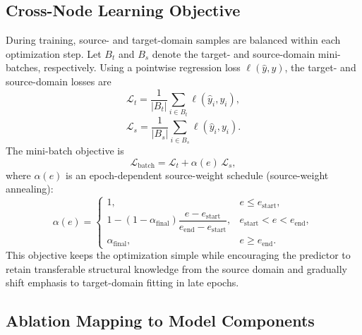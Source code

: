 \documentclass[10pt,a4paper]{article}
\begin{document}
\subsection{Cross-Node Learning Objective}

During training, source- and target-domain samples are balanced within each optimization step. Let $B_t$ and $B_s$ denote the target- and source-domain mini-batches, respectively. Using a pointwise regression loss $\ell(\hat{y},y)$, the target- and source-domain losses are
\begin{equation}
    \mathcal{L}_t =
    \frac{1}{|B_t|}
    \sum_{i \in B_t}
    \ell(\hat{y}_i, y_i),
\end{equation}
\begin{equation}
    \mathcal{L}_s =
    \frac{1}{|B_s|}
    \sum_{i \in B_s}
    \ell(\hat{y}_i, y_i).
\end{equation}
The mini-batch objective is
\begin{equation}
    \mathcal{L}_{\mathrm{batch}} =
    \mathcal{L}_t + \alpha(e)\,\mathcal{L}_s,
\end{equation}
where $\alpha(e)$ is an epoch-dependent source-weight schedule (source-weight annealing):
\begin{equation}
\alpha(e)=
\begin{cases}
1, & e \le e_{\mathrm{start}},\\[4pt]
1-\left(1-\alpha_{\mathrm{final}}\right)\dfrac{e-e_{\mathrm{start}}}{e_{\mathrm{end}}-e_{\mathrm{start}}}, & e_{\mathrm{start}}<e<e_{\mathrm{end}},\\[8pt]
\alpha_{\mathrm{final}}, & e \ge e_{\mathrm{end}}.
\end{cases}
\end{equation}
This objective keeps the optimization simple while encouraging the predictor to retain transferable structural knowledge from the source domain and gradually shift emphasis to target-domain fitting in late epochs.

\subsection{Ablation Mapping to Model Components}
\end{document}
